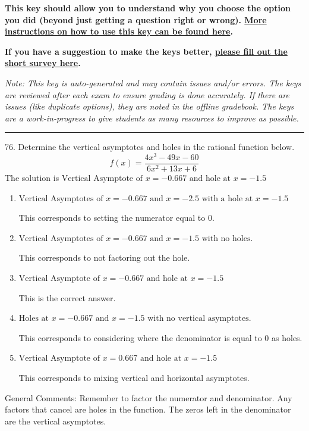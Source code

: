 \documentclass{extbook}[14pt]
\begin{document}
\textbf{This key should allow you to understand why you choose the option you did (beyond just getting a question right or wrong). \href{https://xronos.clas.ufl.edu/mac1105spring2020/courseDescriptionAndMisc/Exams/LearningFromResults}{More instructions on how to use this key can be found here}.}

\textbf{If you have a suggestion to make the keys better, \href{https://forms.gle/CZkbZmPbC9XALEE88}{please fill out the short survey here}.}

\textit{Note: This key is auto-generated and may contain issues and/or errors. The keys are reviewed after each exam to ensure grading is done accurately. If there are issues (like duplicate options), they are noted in the offline gradebook. The keys are a work-in-progress to give students as many resources to improve as possible.}

\rule{\textwidth}{0.4pt}

76. Determine the vertical asymptotes and holes in the rational function below.
\[ f(x) = \frac{4x^{3} -49 x -60}{6x^{2} +13 x + 6} \] 
The solution is $ \text{Vertical Asymptote of } x = -0.667 \text{ and hole at } x = -1.5 $ 

\begin{enumerate}[label=\Alph*.] 
\item $ \text{Vertical Asymptotes of } x = -0.667 \text{ and } x = -2.5 \text{ with a hole at } x = -1.5 $ 

 This corresponds to setting the numerator equal to 0. 
\item $ \text{Vertical Asymptotes of } x = -0.667 \text{ and } x = -1.5 \text{ with no holes.} $ 

 This corresponds to not factoring out the hole. 
\item $ \text{Vertical Asymptote of } x = -0.667 \text{ and hole at } x = -1.5 $ 

 This is the correct answer. 
\item $ \text{Holes at } x = -0.667 \text{ and } x = -1.5 \text{ with no vertical asymptotes.} $ 

 This corresponds to considering where the denominator is equal to 0 as holes. 
\item $ \text{Vertical Asymptote of } x = 0.667 \text{ and hole at } x = -1.5 $ 

 This corresponds to mixing vertical and horizontal asymptotes. 
\end{enumerate} 
 
General Comments: Remember to factor the numerator and denominator. Any factors that cancel are holes in the function. The zeros left in the denominator are the vertical asymptotes.
\end{document}
